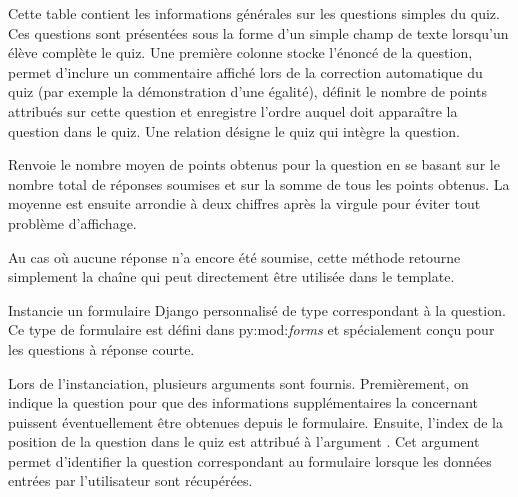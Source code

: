 \documentclass[a4,10pt,french]{sphinxmanual}
\begin{document}
\begin{fulllineitems}
\label{database:quiz.models.SimpleQuestion}
Cette table contient les informations générales sur les questions simples du quiz.
Ces questions sont présentées sous la forme d'un simple champ de texte lorsqu'un
élève complète le quiz. Une première colonne  stocke l'énoncé de la
question,  permet d'inclure un commentaire affiché lors de la
correction automatique du quiz (par exemple la démonstration d'une égalité),
 définit le nombre de points attribués sur cette question et 
enregistre l'ordre auquel doit apparaître la question dans le quiz. Une relation
désigne le quiz qui intègre la question.

\begin{fulllineitems}
\label{database:quiz.models.SimpleQuestion.average_result}
Renvoie le nombre moyen de points obtenus pour la question en se basant sur
le nombre total de réponses soumises et sur la somme de tous les points obtenus.
La moyenne est ensuite arrondie à deux chiffres après la virgule pour éviter
tout problème d'affichage.

Au cas où aucune réponse n'a encore été soumise, cette méthode retourne
simplement la chaîne \code{-{-}} qui peut directement être utilisée dans le template.

\end{fulllineitems}


\begin{fulllineitems}
\label{database:quiz.models.SimpleQuestion.create_form}
Instancie un formulaire Django personnalisé de type  correspondant
à la question. Ce type de formulaire est défini dans py:mod:\emph{forms} et spécialement
conçu pour les questions à réponse courte.

Lors de l'instanciation, plusieurs arguments sont fournis. Premièrement,
on indique la question  pour que des informations supplémentaires
la concernant puissent éventuellement être obtenues depuis le formulaire.
Ensuite, l'index de la position de la question dans le quiz est attribué à
l'argument . Cet argument permet d'identifier la question correspondant
au formulaire lorsque les données entrées par l'utilisateur sont récupérées.


\end{fulllineitems}
\end{fulllineitems}
\end{document}
